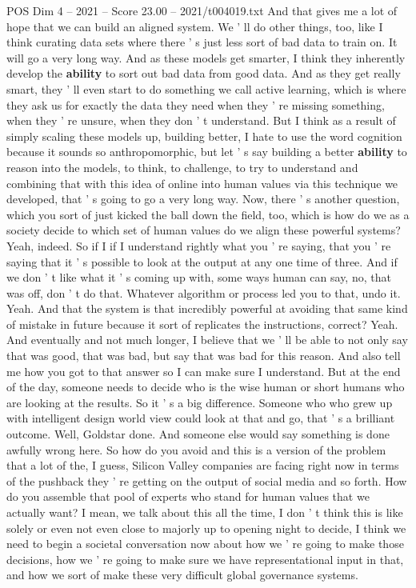 \begin{textsample}{POS Dim 4 – 2021 – Score 23.00 – 2021/t004019.txt}
And that gives me a lot of hope that we can build an aligned system.
We ' ll do other things, too, like I think curating data sets where there ' s just less sort of bad data to train on.
It will go a very long way.
And as these models get smarter, I think they inherently develop the \textbf{ability} to sort out bad data from good data.
And as they get really smart, they ' ll even start to do something we call active learning, which is where they ask us for exactly the data they need when they ' re missing something, when they ' re unsure, when they don ' t understand.
But I think as a result of simply scaling these models up, building better, I hate to use the word cognition because it sounds so anthropomorphic, but let ' s say building a better \textbf{ability} to reason into the models, to think, to challenge, to try to understand and combining that with this idea of online into human values via this technique we developed, that ' s going to go a very long way.
Now, there ' s another question, which you sort of just kicked the ball down the field, too, which is how do we as a society decide to which set of human values do we align these powerful systems?
Yeah, indeed.
So if I if I understand rightly what you ' re saying, that you ' re saying that it ' s possible to look at the output at any one time of three.
And if we don ' t like what it ' s coming up with, some ways human can say, no, that was off, don ' t do that.
Whatever algorithm or process led you to that, undo it.
Yeah.
And that the system is that incredibly powerful at avoiding that same kind of mistake in future because it sort of replicates the instructions, correct?
Yeah.
And eventually and not much longer, I believe that we ' ll be able to not only say that was good, that was bad, but say that was bad for this reason.
And also tell me how you got to that answer so I can make sure I understand.
But at the end of the day, someone needs to decide who is the wise human or short humans who are looking at the results.
So it ' s a big difference.
Someone who who grew up with intelligent design world view could look at that and go, that ' s a brilliant outcome.
Well, Goldstar done.
And someone else would say something is done awfully wrong here.
So how do you avoid and this is a version of the problem that a lot of the, I guess, Silicon Valley companies are facing right now in terms of the pushback they ' re getting on the output of social media and so forth.
How do you assemble that pool of experts who stand for human values that we actually want?
I mean, we talk about this all the time, I don ' t think this is like solely or even not even close to majorly up to opening night to decide, I think we need to begin a societal conversation now about how we ' re going to make those decisions, how we ' re going to make sure we have representational input in that, and how we sort of make these very difficult global governance systems.

\end{textsample}
